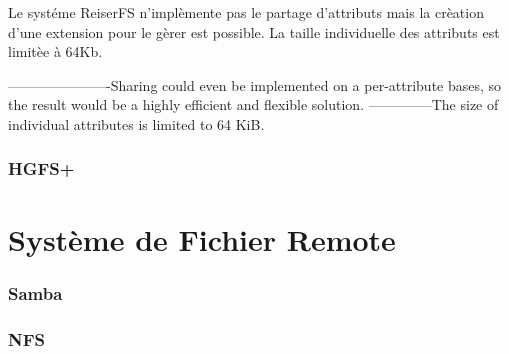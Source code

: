 Le systéme ReiserFS n'implèmente pas le partage d'attributs mais la crèation d'une extension pour le gèrer est possible. La taille individuelle des attributs est limitèe à 64Kb.

----------------------Sharing could even be implemented
on a per-attribute bases, so the result would be
a highly efficient and flexible solution. --------------The size of individual
attributes is limited to 64 KiB.

\subsubsection*{HGFS+}

\section*{Système de Fichier Remote}
\subsubsection*{Samba}

\subsubsection*{NFS}
